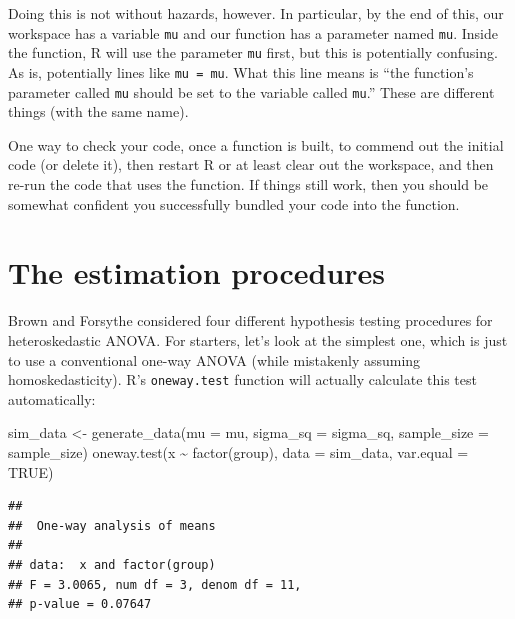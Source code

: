 \documentclass[
]{book}
\newenvironment{Shaded}{\begin{snugshade}}{\end{snugshade}}
\newcommand{\AttributeTok}[1]{\textcolor[rgb]{0.77,0.63,0.00}{#1}}
\newcommand{\ConstantTok}[1]{\textcolor[rgb]{0.00,0.00,0.00}{#1}}
\newcommand{\FunctionTok}[1]{\textcolor[rgb]{0.00,0.00,0.00}{#1}}
\newcommand{\NormalTok}[1]{#1}
\newcommand{\OtherTok}[1]{\textcolor[rgb]{0.56,0.35,0.01}{#1}}
\newcommand{\SpecialCharTok}[1]{\textcolor[rgb]{0.00,0.00,0.00}{#1}}
\begin{document}
Doing this is not without hazards, however.
In particular, by the end of this, our workspace has a variable \texttt{mu} and our function has a parameter named \texttt{mu}.
Inside the function, R will use the parameter \texttt{mu} first, but this is potentially confusing.
As is, potentially lines like \texttt{mu\ =\ mu}.
What this line means is ``the function's parameter called \texttt{mu} should be set to the variable called \texttt{mu}.''
These are different things (with the same name).

One way to check your code, once a function is built, to commend out the initial code (or delete it), then restart R or at least clear out the workspace, and then re-run the code that uses the function.
If things still work, then you should be somewhat confident you successfully bundled your code into the function.

\hypertarget{the-estimation-procedures}{%
\section{The estimation procedures}\label{the-estimation-procedures}}

Brown and Forsythe considered four different hypothesis testing procedures for heteroskedastic ANOVA. For starters, let's look at the simplest one, which is just to use a conventional one-way ANOVA (while mistakenly assuming homoskedasticity). R's \texttt{oneway.test} function will actually calculate this test automatically:

\begin{Shaded}
\begin{Highlighting}[]
\NormalTok{sim\_data }\OtherTok{\textless{}{-}} \FunctionTok{generate\_data}\NormalTok{(}\AttributeTok{mu =}\NormalTok{ mu, }\AttributeTok{sigma\_sq =}\NormalTok{ sigma\_sq,}
                          \AttributeTok{sample\_size =}\NormalTok{ sample\_size)}
\FunctionTok{oneway.test}\NormalTok{(x }\SpecialCharTok{\textasciitilde{}} \FunctionTok{factor}\NormalTok{(group), }\AttributeTok{data =}\NormalTok{ sim\_data, }\AttributeTok{var.equal =} \ConstantTok{TRUE}\NormalTok{)}
\end{Highlighting}
\end{Shaded}

\begin{verbatim}
## 
##  One-way analysis of means
## 
## data:  x and factor(group)
## F = 3.0065, num df = 3, denom df = 11,
## p-value = 0.07647
\end{verbatim}
\end{document}
